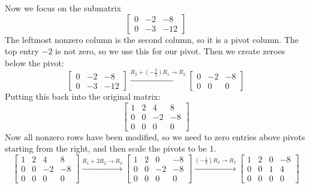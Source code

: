 \documentclass[12pt,letterpaper]{article}
\begin{document}
\begin{enumerate}
  Now we focus on the submatrix
  \[
    \left[
      \begin{array}{ccc}
        0&-2&-8\\
        0&-3&-12
      \end{array}
    \right]
  \]
  The leftmost nonzero column is the second column, so it is a pivot column. The top entry $-2$ is not zero, so we use this for our pivot. Then we create zeroes below the pivot:
  \[
    \left[
      \begin{array}{ccc}
        0&-2&-8\\
        0&-3&-12
      \end{array}
    \right]\xrightarrow{R_2+(-\frac{3}{2})R_1\rightarrow R_2}
    \left[
      \begin{array}{ccc}
        0&-2&-8\\
        0&0&0
      \end{array}
    \right]
  \]
  Putting this back into the original matrix:
  \[
    \left[
      \begin{array}{cccc}
        1&2&4&8\\
        0&0&-2&-8\\
        0&0&0&0
      \end{array}
    \right]
  \]
  Now all nonzero rows have been modified, so we need to zero entries above pivots starting from the right, and then scale the pivots to be $1$.
  \[
    \left[
      \begin{array}{cccc}
        1&2&4&8\\
        0&0&-2&-8\\
        0&0&0&0
      \end{array}
    \right]\xrightarrow{R_1+2R_2\rightarrow R_2}
    \left[
      \begin{array}{cccc}
        1&2&0&-8\\
        0&0&-2&-8\\
        0&0&0&0
      \end{array}
    \right]\xrightarrow{(-\frac{1}{2})R_2\rightarrow R_2}
    \left[
      \begin{array}{cccc}
        1&2&0&-8\\
        0&0&1&4\\
        0&0&0&0
      \end{array}
    \right]
  \]


\end{enumerate}
\end{document}
